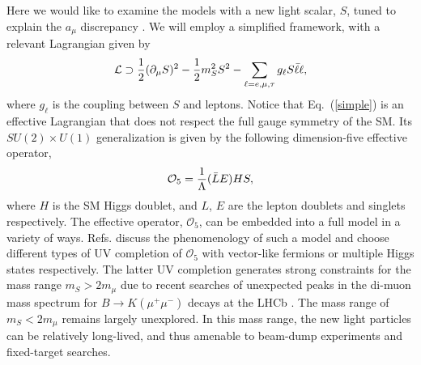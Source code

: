 \documentclass[prd,onecolumn,notitlepage,
nofootinbib,aps,tightenlines,
preprintnumbers,amsmath,amssymb,amsfonts,showpacs,superscriptaddress]{revtex4-1}
\renewcommand{\eqref}[1]{Eq.~(\ref{#1})}
\newcommand{\be}{\begin{eqnarray}}
\newcommand{\ee}{\end{eqnarray}}
\begin{document}
Here we would like to examine the models with a new light scalar, $S$, tuned to explain the $a_\mu$ discrepancy \cite{Chen:2015vqy,Batell:2016ove}. 
We will employ a simplified framework, with a relevant Lagrangian given by
\be
{\cal L}\supset{1\over2}(\partial_\mu S)^2 -{1\over2}m_S^2 S^2 - \sum_{\ell =e, \mu, \tau} g_\ell S \bar{\ell}\ell,
\label{simple}
\ee
where  $g_\ell$ is the coupling between $S$ and leptons. Notice that \eqref{simple} is an effective Lagrangian that does not respect the full gauge symmetry of the SM. 
Its $SU(2)\times U(1)$ generalization  is given by the following dimension-five effective operator,
\be
{\cal O}_5 = \frac{1}{\Lambda} (\bar L E) H S, 
\label{O}
\ee
where $H$ is the SM Higgs doublet, and $L$, $E$ are the lepton doublets and singlets respectively. The effective operator, $\mathcal O_5$,
can be embedded into a full model in a variety of ways. 
Refs. \cite{Chen:2015vqy,Batell:2016ove} discuss the phenomenology of such a model and choose different types 
of UV completion of $\mathcal O_5$ with vector-like fermions or multiple Higgs states respectively. The latter UV completion 
generates strong constraints for the mass range $m_S > 2 m_\mu$ due to recent searches of unexpected peaks in the 
di-muon mass spectrum for $B\to K(\mu^+\mu^-)$ decays at the LHCb \cite{Aaij:2015tna}. The mass range of $m_S<2 m_\mu$ remains 
largely unexplored. In this mass range, the new light particles can be relatively long-lived, and thus amenable to beam-dump experiments and fixed-target searches. 
\end{document}
